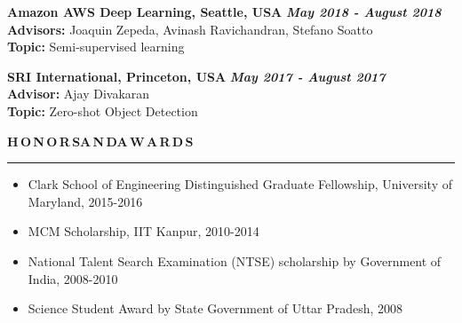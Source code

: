 \documentclass[11pt, a4paper]{article}
\begin{document}
\vspace{4pt}


\textbf{Amazon AWS Deep Learning, Seattle, USA} \hfill \textit{\textbf{May 2018 - August 2018}} \\
\textbf{Advisors: }Joaquin Zepeda, Avinash Ravichandran, Stefano Soatto \\
\textbf{Topic: }Semi-supervised learning

\vspace{4pt}

\textbf{SRI International, Princeton, USA} \hfill \textit{\textbf{May 2017 - August 2017}} \\
\textbf{Advisor: }Ajay Divakaran \\
\textbf{Topic: }Zero-shot Object Detection

%

%
	
\vspace{8pt}

\textbf{H\,O\,N\,O\,R\,S{\hspace{0.6em}}A\,N\,D{\hspace{0.6em}}A\,W\,A\,R\,D\,S}
\vspace{5pt}
\hrule
\vspace{-3pt}
\begin{itemize}[leftmargin=*] \itemsep1pt \parskip0pt 
\item Clark School of Engineering Distinguished Graduate Fellowship, University of Maryland, 2015-2016
\item MCM Scholarship, IIT Kanpur, 2010-2014
\item National Talent Search Examination (NTSE) scholarship by Government of India, 2008-2010
\item Science Student Award by State Government of Uttar Pradesh, 2008
\end{itemize}
\end{document}

